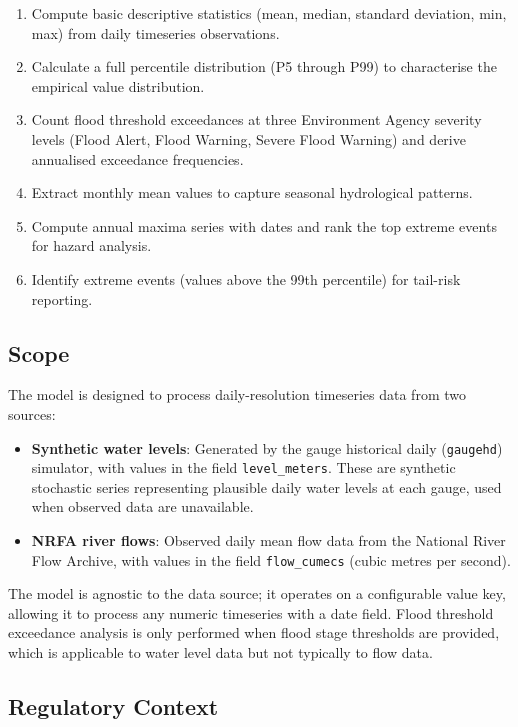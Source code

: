 \documentclass[11pt,a4paper]{article}
\begin{document}
\begin{enumerate}[label=(\roman*)]
    \item Compute basic descriptive statistics (mean, median, standard deviation, min, max) from daily timeseries observations.
    \item Calculate a full percentile distribution (P5 through P99) to characterise the empirical value distribution.
    \item Count flood threshold exceedances at three Environment Agency severity levels (Flood Alert, Flood Warning, Severe Flood Warning) and derive annualised exceedance frequencies.
    \item Extract monthly mean values to capture seasonal hydrological patterns.
    \item Compute annual maxima series with dates and rank the top extreme events for hazard analysis.
    \item Identify extreme events (values above the 99th percentile) for tail-risk reporting.
\end{enumerate}

\subsection{Scope}

The model is designed to process daily-resolution timeseries data from two sources:

\begin{itemize}
    \item \textbf{Synthetic water levels}: Generated by the gauge historical daily (\texttt{gaugehd}) simulator, with values in the field \texttt{level\_meters}. These are synthetic stochastic series representing plausible daily water levels at each gauge, used when observed data are unavailable.
    \item \textbf{NRFA river flows}: Observed daily mean flow data from the National River Flow Archive, with values in the field \texttt{flow\_cumecs} (cubic metres per second).
\end{itemize}

\noindent The model is agnostic to the data source; it operates on a configurable value key, allowing it to process any numeric timeseries with a date field. Flood threshold exceedance analysis is only performed when flood stage thresholds are provided, which is applicable to water level data but not typically to flow data.

\subsection{Regulatory Context}
\end{document}
